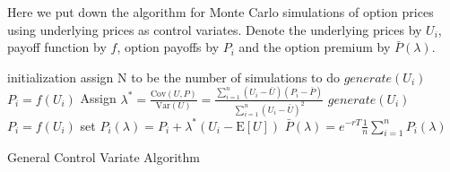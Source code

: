 Here we put down the algorithm for Monte Carlo simulations of option prices using underlying prices as control variates. Denote the underlying prices by $U_{i}$, payoff function by $f$, option payoffs by $P_{i}$ and the option premium by $\bar{P}(\lambda)$.\\[5mm]
\begin{algorithm}[H]
 initialization\;
 assign N to be the number of simulations to do\;
  {
  \quad $generate(U_{i})$\;
  \quad $P_{i} = f(U_{i})$\;
 }
 Assign $\lambda^{*} = \frac{\mathrm{Cov}(U, P)}{\mathrm{Var}(U)} = \frac{\sum_{i=1}^{n}(U_{i}-\bar{U})(P_{i}-\bar{P})}{\sum_{i=1}^{n}(U_{i}-\bar{U})^{2}}$\;
  {
  \quad $generate(U_{i})$\;
  \quad $P_{i} = f(U_{i})$\;
  \quad set ${P}_{i}(\lambda) = P_{i} + \lambda^{*}(U_{i}-\mathrm{E}[U])$\;
 }
 $\bar{P}(\lambda) = e^{-rT}\frac{1}{n} \sum_{i=1}^{n} {P}_{i}(\lambda)$\;
\caption{General Control Variate Algorithm}
\end{algorithm}
\newpage
